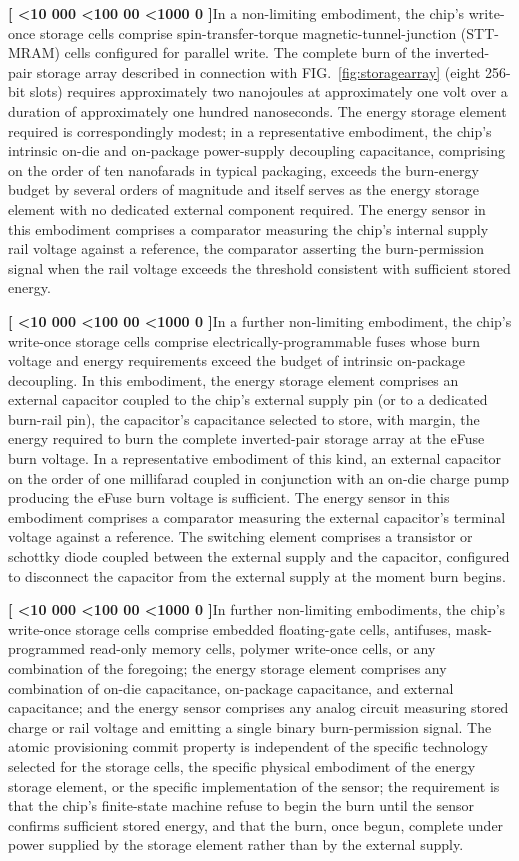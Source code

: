 \documentclass[12pt,letterpaper]{article}
\newcounter{para}
\newcommand{\padzero}{%
  \ifnum\value{para}<10 000\else%
  \ifnum\value{para}<100 00\else%
  \ifnum\value{para}<1000 0\else%
  \fi\fi\fi}
\newcommand{\para}{%
  \refstepcounter{para}\noindent\textbf{[\padzero\arabic{para}]}\hspace{0.5em}\ignorespaces}
\newcounter{fig}
\newcommand{\figref}[1]{FIG.~\ref{fig:#1}}
\begin{document}
\para In a non-limiting embodiment, the chip's write-once storage cells comprise spin-transfer-torque magnetic-tunnel-junction (STT-MRAM) cells configured for parallel write. The complete burn of the inverted-pair storage array described in connection with \figref{storagearray} (eight 256-bit slots) requires approximately two nanojoules at approximately one volt over a duration of approximately one hundred nanoseconds. The energy storage element required is correspondingly modest; in a representative embodiment, the chip's intrinsic on-die and on-package power-supply decoupling capacitance, comprising on the order of ten nanofarads in typical packaging, exceeds the burn-energy budget by several orders of magnitude and itself serves as the energy storage element with no dedicated external component required. The energy sensor in this embodiment comprises a comparator measuring the chip's internal supply rail voltage against a reference, the comparator asserting the burn-permission signal when the rail voltage exceeds the threshold consistent with sufficient stored energy.

\para In a further non-limiting embodiment, the chip's write-once storage cells comprise electrically-programmable fuses whose burn voltage and energy requirements exceed the budget of intrinsic on-package decoupling. In this embodiment, the energy storage element comprises an external capacitor coupled to the chip's external supply pin (or to a dedicated burn-rail pin), the capacitor's capacitance selected to store, with margin, the energy required to burn the complete inverted-pair storage array at the eFuse burn voltage. In a representative embodiment of this kind, an external capacitor on the order of one millifarad coupled in conjunction with an on-die charge pump producing the eFuse burn voltage is sufficient. The energy sensor in this embodiment comprises a comparator measuring the external capacitor's terminal voltage against a reference. The switching element comprises a transistor or schottky diode coupled between the external supply and the capacitor, configured to disconnect the capacitor from the external supply at the moment burn begins.

\para In further non-limiting embodiments, the chip's write-once storage cells comprise embedded floating-gate cells, antifuses, mask-programmed read-only memory cells, polymer write-once cells, or any combination of the foregoing; the energy storage element comprises any combination of on-die capacitance, on-package capacitance, and external capacitance; and the energy sensor comprises any analog circuit measuring stored charge or rail voltage and emitting a single binary burn-permission signal. The atomic provisioning commit property is independent of the specific technology selected for the storage cells, the specific physical embodiment of the energy storage element, or the specific implementation of the sensor; the requirement is that the chip's finite-state machine refuse to begin the burn until the sensor confirms sufficient stored energy, and that the burn, once begun, complete under power supplied by the storage element rather than by the external supply.
\end{document}
